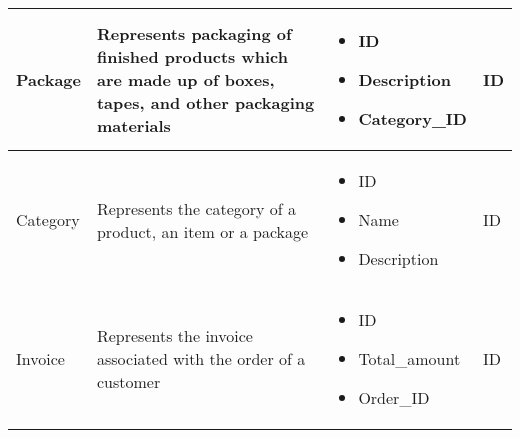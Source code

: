 \begin{longtable}{|p{}|p{} |p{}|p{} |}
    Package & Represents packaging of finished products which are made up of boxes, tapes, and other packaging materials &
    \begin{itemize}
        \vspace{-1em}
        \item ID
        \item Description
        \item Category\_ID
    \end{itemize}
    &  ID \\\hline

    Category & Represents the category of a product, an item or a package &
    \begin{itemize}
        \vspace{-1em}
        \item ID
        \item Name
        \item Description
    \end{itemize}
    &  ID \\\hline

    Invoice & Represents the invoice associated with the order of a customer &
    \begin{itemize}
        \vspace{-1em}
        \item ID
        \item Total\_amount     %
        \item Order\_ID
    \end{itemize}
    &  ID \\\hline
\end{longtable}